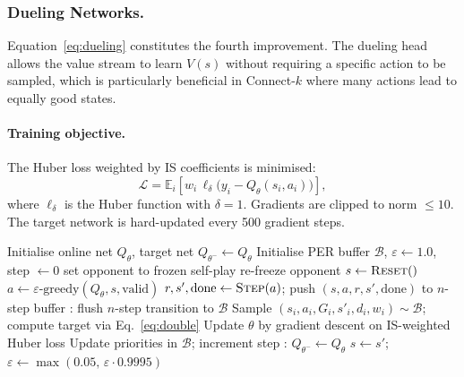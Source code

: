\documentclass[10pt, letterpaper, twocolumn]{article}
\newcommand{\E}{\mathbb{E}}
\begin{document}
\subsubsection{Dueling Networks.}
Equation~\eqref{eq:dueling} constitutes the fourth improvement.  The
dueling head allows the value stream to learn $V(s)$ without requiring a
specific action to be sampled, which is particularly beneficial in
Connect-$k$ where many actions lead to equally good states.

\paragraph{Training objective.}
The Huber loss weighted by IS coefficients is minimised:
\begin{equation}
  \mathcal{L} = \E_i\!\left[w_i\, \ell_\delta\bigl(y_i - Q_\theta(s_i,a_i)\bigr)\right],
\end{equation}
where $\ell_\delta$ is the Huber function with $\delta = 1$.  Gradients
are clipped to norm $\leq 10$.  The target network is hard-updated every
500 gradient steps.

\begin{algorithm}[t]
\caption{Rainbow DQN Training}
\label{alg:dqn}
\begin{algorithmic}[1]
\State Initialise online net $Q_\theta$, target net $Q_{\theta^-} \gets Q_\theta$
\State Initialise PER buffer $\mathcal{B}$, $\varepsilon \gets 1.0$, step $\gets 0$
   set opponent to frozen self-play \EndIf
   re-freeze opponent \EndIf
  \State $s \gets \textsc{Reset}()$
  \Repeat
    \State $a \gets \varepsilon\text{-greedy}(Q_\theta, s, \text{valid})$
    \State $r, s', \text{done} \gets \textsc{Step}(a)$; push $(s,a,r,s',\text{done})$ to $n$-step buffer
    : flush $n$-step transition to $\mathcal{B}$
    \EndIf
      \State Sample $(s_i, a_i, G_i, s'_i, d_i, w_i) \sim \mathcal{B}$; compute target via Eq.~\eqref{eq:double}
      \State Update $\theta$ by gradient descent on IS-weighted Huber loss
      \State Update priorities in $\mathcal{B}$; increment step
      : $Q_{\theta^-} \gets Q_\theta$
      \EndIf
    \EndIf
    \State $s \gets s'$; $\varepsilon \gets \max(0.05,\, \varepsilon \cdot 0.9995)$
\EndFor
\end{algorithmic}
\end{algorithm}
\end{document}
